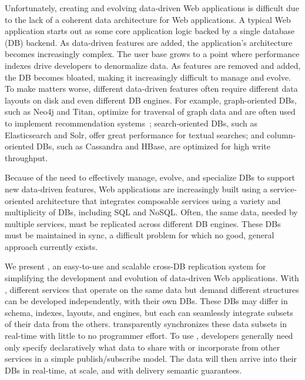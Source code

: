 Unfortunately, creating and evolving data-driven Web applications is
difficult due to the lack of a coherent data architecture for
Web applications. A typical Web application starts out as some core
application logic backed by a single database (DB) backend.
As data-driven features are added, the application's architecture becomes increasingly complex.
The user base grows to a point where performance indexes drive developers to
denormalize data. As features are removed and added, the DB becomes
bloated, making it increasingly difficult to manage and evolve.
To make matters worse, different data-driven features often require different
data layouts on disk and even different DB engines.
For example, graph-oriented DBs, such as Neo4j and Titan, optimize for
traversal of graph data and are often used to implement recommendation
systems~\cite{db-revolution}; search-oriented DBs, such as
Elasticsearch and Solr, offer great performance for textual searches; and
column-oriented DBs, such as Cassandra and HBase,
are optimized for high write throughput.

Because of the need to effectively manage, evolve, and specialize
DBs to support new data-driven features, Web applications
are increasingly built using a service-oriented architecture that
integrates composable services using a variety and multiplicity of
DBs, including SQL and NoSQL.  Often, the same data, needed by
multiple services, must be replicated across different DB
engines.  These DBs must be maintained in sync, a difficult
problem for which no good, general approach currently exists.  

We present {\em \synapse{}}, an easy-to-use and scalable
cross-DB replication system for simplifying the development and 
evolution of data-driven Web applications.  With \synapse, different
services that operate on the same data but demand
different structures can be developed independently, with their
own DBs. These DBs may differ in schema, indexes, layouts,
and engines, but each can seamlessly integrate subsets of
their data from the others.
\synapse transparently synchronizes these data subsets
in real-time with little to no programmer effort. To use \synapse,
developers generally need only specify declaratively what data to
share with or incorporate from other services in a simple
publish/subscribe model.  The data will then arrive into their DBs
in real-time, at scale, and with delivery semantic guarantees.

